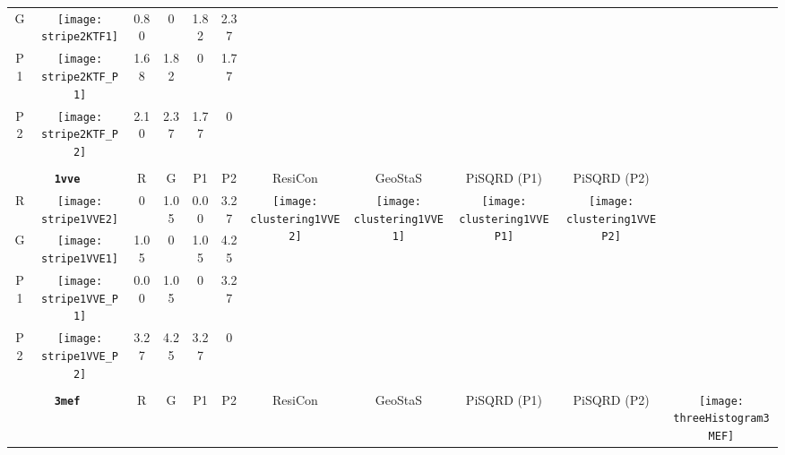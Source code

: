 \documentclass[a4paper,11pt,twoside]{book}%
\begin{document}
\begin{appendices}
\begin{sidewaystable}[h!]
\begin{tabular*}{4cm}{cc|c|c|c|c|c|c|c|c|c|}
\cline{1-6}
\multicolumn{1}{|c|}{G} & \texttt{[image: stripe2KTF1]} & 0.80 & 0 & 1.82 & 2.37 & \multirow{4}{*}{} & \multirow{4}{*}{} & \multirow{4}{*}{} & \multirow{4}{*}{} & \multirow{5}{*}{} \\
\cline{1-6}
\multicolumn{1}{|c|}{P1} & \texttt{[image: stripe2KTF\_P1]} & 1.68 & 1.82 & 0 & 1.77 & \multirow{4}{*}{} & \multirow{4}{*}{} & \multirow{4}{*}{} & \multirow{4}{*}{} & \multirow{5}{*}{}  \\
\cline{1-6}
\multicolumn{1}{|c|}{P2} & \texttt{[image: stripe2KTF\_P2]} & 2.10 & 2.37 & 1.77 & 0 & \multirow{4}{*}{} & \multirow{4}{*}{} & \multirow{4}{*}{} & \multirow{4}{*}{} & \multirow{5}{*}{}  \\
\cline{1-11}
\\
\cline{1-11}
\multicolumn{2}{|c|}{{\bf \texttt{1vve}}} & R & G & P1 & P2 & ResiCon & GeoStaS & PiSQRD (P1) & PiSQRD (P2) & \multirow{5}{*}{\vspace{-0.15cm}\texttt{[image: threeHistogram1VVE]}}  \\
\cline{1-10}
\multicolumn{1}{|c|}{R} & \texttt{[image: stripe1VVE2]} & 0 & 1.05 & 0.00 & 3.27 & \multirow{4}{*}{\vspace{-0.3cm}\texttt{[image: clustering1VVE2]}} & \multirow{4}{*}{\vspace{-0.3cm}\texttt{[image: clustering1VVE1]}} & \multirow{4}{*}{\vspace{-0.3cm}\texttt{[image: clustering1VVEP1]}} & \multirow{4}{*}{\vspace{-0.3cm}\texttt{[image: clustering1VVEP2]}} &  \multirow{5}{*}{} \\
\cline{1-6}
\multicolumn{1}{|c|}{G} & \texttt{[image: stripe1VVE1]} & 1.05 & 0 & 1.05 & 4.25 & \multirow{4}{*}{} & \multirow{4}{*}{} & \multirow{4}{*}{} & \multirow{4}{*}{} & \multirow{5}{*}{} \\
\cline{1-6}
\multicolumn{1}{|c|}{P1} & \texttt{[image: stripe1VVE\_P1]} & 0.00 & 1.05 & 0 & 3.27 & \multirow{4}{*}{} & \multirow{4}{*}{} & \multirow{4}{*}{} & \multirow{4}{*}{} & \multirow{5}{*}{}  \\
\cline{1-6}
\multicolumn{1}{|c|}{P2} & \texttt{[image: stripe1VVE\_P2]} & 3.27 & 4.25 & 3.27 & 0 & \multirow{4}{*}{} & \multirow{4}{*}{} & \multirow{4}{*}{} & \multirow{4}{*}{} & \multirow{5}{*}{}  \\
\cline{1-11}
\\
\cline{1-11}
\multicolumn{2}{|c|}{{\bf \texttt{3mef}}} & R & G & P1 & P2 & ResiCon & GeoStaS & PiSQRD (P1) & PiSQRD (P2) & \multirow{5}{*}{\vspace{-0.15cm}\texttt{[image: threeHistogram3MEF]}}  \\

\end{tabular*}
\end{sidewaystable}
\end{appendices}
\end{document}
